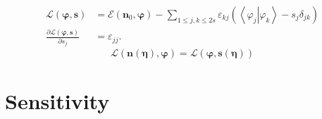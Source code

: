 \documentclass[aps,preprint]{revtex4}%
\begin{document}
\begin{align}
\mathcal{L}\left(  \mathbf{\varphi,s}\right)   &  =\mathcal{E}\left(
\mathbf{n}_{0}\mathbf{,\varphi}\right)  -\sum_{1\leq j,k\leq2s}\varepsilon
_{kj}\left(  \left\langle \left.  \varphi_{j}\right\vert \varphi
_{k}\right\rangle -s_{j}\delta_{jk}\right) \\
\frac{\partial\mathcal{L}\left(  \mathbf{\varphi,s}\right)  }{\partial s_{j}}
&  =\varepsilon_{jj}.
\end{align}%
\begin{equation}
\mathcal{L}\left(  \mathbf{n\left(  \mathbf{\eta}\right)  ,\varphi}\right)
=\mathcal{L}\left(  \mathbf{\varphi,s}\left(  \mathbf{\eta}\right)  \right)
\end{equation}


\section{Sensitivity}
\end{document}
